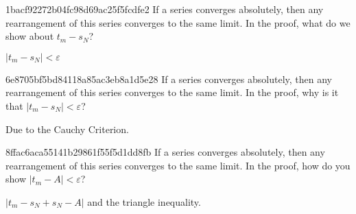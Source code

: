 \begin{note}{1bacf92272b04fc98d69ac25f5fcdfe2}
    If a series converges absolutely, then any rearrangement of this series converges to the same limit.
    In the proof, what do we show about \({ t_m - s_N }\)?

    \begin{cloze}{1}
        \({ \left\lvert t_m - s_N \right\rvert < \varepsilon }\)
    \end{cloze}
\end{note}

\begin{note}{6e8705bf5bd84118a85ac3eb8a1d5e28}
    If a series converges absolutely, then any rearrangement of this series converges to the same limit.
    In the proof, why is it that \({ \left\lvert t_m - s_N \right\rvert < \varepsilon }\)?

    \begin{cloze}{1}
        Due to the Cauchy Criterion.
    \end{cloze}
\end{note}

\begin{note}{8ffac6aca55141b29861f55f5d1dd8fb}
    If a series converges absolutely, then any rearrangement of this series converges to the same limit.
    In the proof, how do you show \({ \left\lvert t_m - A \right\rvert < \varepsilon }\)?

    \begin{cloze}{1}
        \({ \left\lvert t_m - s_N + s_N - A \right\rvert }\) and the triangle inequality.
    \end{cloze}
\end{note}


